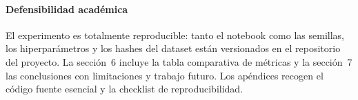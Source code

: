 \paragraph{Defensibilidad académica}
El experimento es totalmente reproducible: tanto el notebook como las semillas, los hiperparámetros y los hashes del dataset están versionados en el repositorio del proyecto. La sección~6 incluye la tabla comparativa de métricas y la sección~7 las conclusiones con limitaciones y trabajo futuro. Los apéndices recogen el código fuente esencial y la checklist de reproducibilidad.
\newpage
